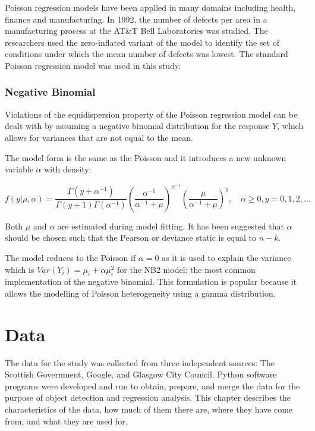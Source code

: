 \documentclass{thesis}
\begin{document}
Poisson regression models have been applied in many domains including health, finance and manufacturing. In 1992, the number of defects per area in a manufacturing process at the AT\&T Bell Laboratories was studied\cite{defects}. The researchers used the zero-inflated variant of the model to identify the set of conditions under which the mean number of defects was lowest. The standard Poisson regression model was used in this study.

\subsection{Negative Binomial}

Violations of the equidispersion property of the Poisson regression model can be dealt with by assuming a negative binomial distribution for the response $Y$, which allows for variances that are not equal to the mean.

The model form is the same as the Poisson and it introduces a new unknown variable $\alpha$ with density:

\begin{equation}
    f(y|\mu,\alpha) = \frac{\Gamma(y + \alpha^{-1})}{\Gamma(y+1)\Gamma(\alpha^{-1})}(\frac{\alpha^{-1}}{\alpha^{-1} + \mu})^{\alpha^{-1}}(\frac{\mu}{\alpha^{-1} + \mu})^y,\hspace{1em}\alpha\ge 0, y=0,1,2,...
\end{equation}

Both $\mu$ and $\alpha$ are estimated during model fitting. It has been suggested that $\alpha$ should be chosen such that the Pearson or deviance static is equal to $n - k$\cite{cameron_trivedi_2013}.

The model reduces to the Poisson if $\alpha = 0$ as it is used to explain the variance which is $Var(Y_i) = \mu_i + \alpha\mu_i^2$ for the NB2 model: the most common implementation of the negative binomial\cite{cameron_trivedi_2013}. This formulation is popular because it allows the modelling of Poisson heterogeneity using a gamma distribution\cite{ncss-neg-bin}.


\chapter{Data} \label{chapter:data}

The data for the study was collected from three independent sources: The Scottish Government, Google, and Glasgow City Council. Python software programs were developed and run to obtain, prepare, and merge the data for the purpose of object detection and regression analysis. This chapter describes the characteristics of the data, how much of them there are, where they have come from, and what they are used for.
\end{document}
